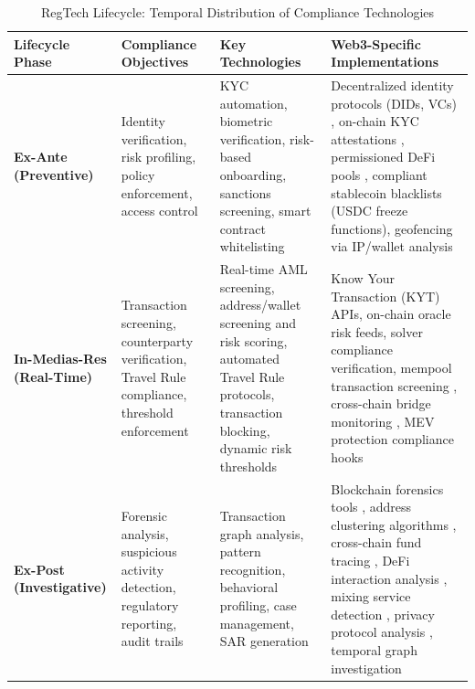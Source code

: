 \begin{table}[t]
\centering
\caption{RegTech Lifecycle: Temporal Distribution of Compliance Technologies}
\label{tab:regtech_lifecycle}
\scriptsize
\begin{tabular}{p{2.5cm}p{3.5cm}p{4.0cm}p{5.5cm}}
\toprule
\textbf{Lifecycle Phase} & \textbf{Compliance Objectives} & \textbf{Key Technologies} & \textbf{Web3-Specific Implementations} \\
\midrule
\textbf{Ex-Ante (Preventive)} & Identity verification, risk profiling, policy enforcement, access control \cite{financialactiontaskforcefatf2012internationalstandardscombating,force2021updatedguidanceriskbased} & KYC automation, biometric verification, risk-based onboarding, sanctions screening, smart contract whitelisting \cite{charoenwong2024regtechtechnologydrivencompliance} & Decentralized identity protocols (DIDs, VCs) \cite{reed2022decentralizedidentifiersdids,camenisch2001efficientsystemnontransferable}, on-chain KYC attestations \cite{yang2024researchidentitydata}, permissioned DeFi pools \cite{ling2025sokstablecoindesigns}, compliant stablecoin blacklists (USDC freeze functions), geofencing via IP/wallet analysis \\
\midrule
\textbf{In-Medias-Res (Real-Time)} & Transaction screening, counterparty verification, Travel Rule compliance, threshold enforcement \cite{force2021opportunitieschallengesnew} & Real-time AML screening, address/wallet screening and risk scoring, automated Travel Rule protocols, transaction blocking, dynamic risk thresholds \cite{moser2014riskscoringbitcoin,weber2019antimoneylaunderingbitcoin} & Know Your Transaction (KYT) APIs, on-chain oracle risk feeds, solver compliance verification, mempool transaction screening \cite{daian2020flashboys20}, cross-chain bridge monitoring \cite{zhang2024securitycrosschainbridges,li2025blockchaincrosschainbridge}, MEV protection compliance hooks \cite{qin2022quantifyingblockchainextractable} \\
\midrule
\textbf{Ex-Post (Investigative)} & Forensic analysis, suspicious activity detection, regulatory reporting, audit trails \cite{financialactiontaskforcefatf2012internationalstandardscombating} & Transaction graph analysis, pattern recognition, behavioral profiling, case management, SAR generation \cite{petterssonruiz2022combatingmoneylaundering,pocher2023detectinganomalouscryptocurrency} & Blockchain forensics tools \cite{meiklejohn2013fistfulbitcoinscharacterizing,yousaf2019tracingtransactionscryptocurrency}, address clustering algorithms \cite{reid2013analysisanonymitybitcoin,ron2013quantitativeanalysisfull}, cross-chain fund tracing \cite{zamyatin2021sokcommunicationdistributed}, DeFi interaction analysis \cite{chen2020understandingethereumgraph,sun2025ethereumfrauddetection}, mixing service detection \cite{wu2021detectingmixingservices}, privacy protocol analysis \cite{kappos2018empiricalanalysisanonymity,kumar2017traceabilityanalysismoneros}, temporal graph investigation \cite{wu2023tracerscalablegraphbased} \\
\bottomrule
\end{tabular}
\end{table}

